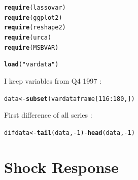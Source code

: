 \documentclass[11pt,oneside, a4paper]{amsart}\usepackage[]{graphicx}\usepackage[]{color}
\makeatletter
\newcommand{\hlnum}[1]{\textcolor[rgb]{0.686,0.059,0.569}{#1}}%
\newcommand{\hlstr}[1]{\textcolor[rgb]{0.192,0.494,0.8}{#1}}%
\newcommand{\hlopt}[1]{\textcolor[rgb]{0,0,0}{#1}}%
\newcommand{\hlstd}[1]{\textcolor[rgb]{0.345,0.345,0.345}{#1}}%
\newcommand{\hlkwb}[1]{\textcolor[rgb]{0.69,0.353,0.396}{#1}}%
\newcommand{\hlkwd}[1]{\textcolor[rgb]{0.737,0.353,0.396}{\textbf{#1}}}%
\newenvironment{kframe}{%
 \def\at@end@of@kframe{}%
 \ifinner\ifhmode%
  \def\at@end@of@kframe{\end{minipage}}%
  \begin{minipage}{\columnwidth}%
 \fi\fi%
 \def\FrameCommand##1{\hskip\@totalleftmargin \hskip-\fboxsep
 \colorbox{shadecolor}{##1}\hskip-\fboxsep
     \hskip-\linewidth \hskip-\@totalleftmargin \hskip\columnwidth}%
 \MakeFramed {\advance\hsize-\width
   \@totalleftmargin\z@ \linewidth\hsize
   \@setminipage}}%
 {\par\unskip\endMakeFramed%
 \at@end@of@kframe}
\newenvironment{knitrout}{}{} %
\makeatother
\begin{document}
\begin{knitrout}
\color{fgcolor}\begin{kframe}
\begin{alltt}
\hlkwd{require}\hlstd{(lassovar)}
\hlkwd{require}\hlstd{(ggplot2)}
\hlkwd{require}\hlstd{(reshape2)}
\hlkwd{require}\hlstd{(urca)}
\hlkwd{require}\hlstd{(MSBVAR)}
\end{alltt}
\end{kframe}
\end{knitrout}

\begin{knitrout}
\color{fgcolor}\begin{kframe}
\begin{alltt}
\hlkwd{load}\hlstd{(}\hlstr{"vardata"}\hlstd{)}
\end{alltt}
\end{kframe}
\end{knitrout}

I keep variables from Q4 1997 :
\begin{knitrout}
\color{fgcolor}\begin{kframe}
\begin{alltt}
\hlstd{data}\hlkwb{<-}\hlkwd{subset}\hlstd{(vardataframe[}\hlnum{116}\hlopt{:}\hlnum{180}\hlstd{,])}
\end{alltt}
\end{kframe}
\end{knitrout}

First difference of all series : 
\begin{knitrout}
\color{fgcolor}\begin{kframe}
\begin{alltt}
\hlstd{difdata} \hlkwb{<-} \hlkwd{tail}\hlstd{(data,}\hlopt{-}\hlnum{1}\hlstd{)} \hlopt{-} \hlkwd{head}\hlstd{(data,}\hlopt{-}\hlnum{1}\hlstd{)}
\end{alltt}
\end{kframe}
\end{knitrout}



\section*{Shock Response}
\end{document}
